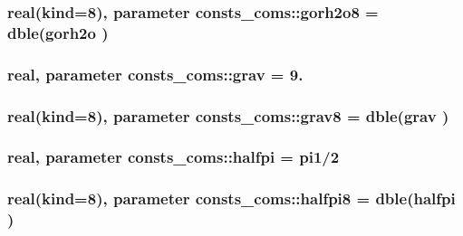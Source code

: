 \subsubsection[{\texorpdfstring{gorh2o8}{gorh2o8}}]{\setlength{\rightskip}{0pt plus 5cm}real(kind=8), parameter consts\+\_\+coms\+::gorh2o8 = dble({\bf gorh2o} )}\hypertarget{namespaceconsts__coms_a9ec374a4fc22a5bdf63ad6a718f91c40}{}\label{namespaceconsts__coms_a9ec374a4fc22a5bdf63ad6a718f91c40}
\subsubsection[{\texorpdfstring{grav}{grav}}]{\setlength{\rightskip}{0pt plus 5cm}real, parameter consts\+\_\+coms\+::grav = 9.}\hypertarget{namespaceconsts__coms_ac1aae6e7087ffc22025cd1527c705e3e}{}\label{namespaceconsts__coms_ac1aae6e7087ffc22025cd1527c705e3e}
\subsubsection[{\texorpdfstring{grav8}{grav8}}]{\setlength{\rightskip}{0pt plus 5cm}real(kind=8), parameter consts\+\_\+coms\+::grav8 = dble({\bf grav} )}\hypertarget{namespaceconsts__coms_a61919bc434d4bb58d80ace52558d4404}{}\label{namespaceconsts__coms_a61919bc434d4bb58d80ace52558d4404}
\subsubsection[{\texorpdfstring{halfpi}{halfpi}}]{\setlength{\rightskip}{0pt plus 5cm}real, parameter consts\+\_\+coms\+::halfpi = {\bf pi1}/2}\hypertarget{namespaceconsts__coms_abbda065eaf0f93e7f1f973705faf75ea}{}\label{namespaceconsts__coms_abbda065eaf0f93e7f1f973705faf75ea}
\subsubsection[{\texorpdfstring{halfpi8}{halfpi8}}]{\setlength{\rightskip}{0pt plus 5cm}real(kind=8), parameter consts\+\_\+coms\+::halfpi8 = dble({\bf halfpi} )}\hypertarget{namespaceconsts__coms_acf446d5c999d6f8574b77c92e6865da5}{}\label{namespaceconsts__coms_acf446d5c999d6f8574b77c92e6865da5}
